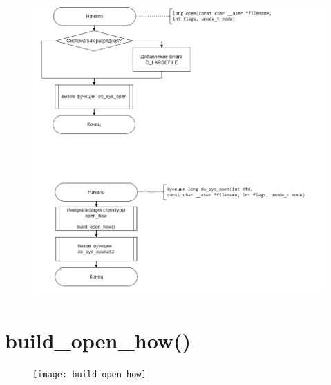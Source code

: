 \documentclass[12pt]{report}
\begin{document}
	\begin{figure}[H]
		\centering
		\includegraphics[scale=0.8]{do_sys_open1}
	\end{figure}

	\begin{figure}[H]
		\centering
	\end{figure}
	
	
	
	
	\section{build\_open\_how()}
	\begin{figure}[H]
		\centering
		\texttt{[image: build\_open\_how]}
	\end{figure}
	
	
	
\end{document}
